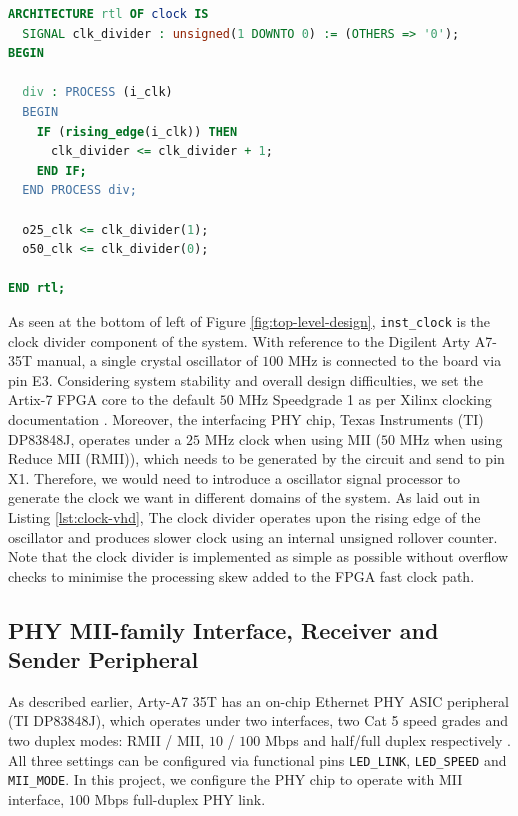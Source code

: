 \documentclass[a4paper]{report}
\newcommand{\code}{\texttt}
\begin{document}
\begin{lstlisting}[language=VHDL, caption=Snippet of Clock Divider \code{clock.vhd}, label={lst:clock-vhd}]
ARCHITECTURE rtl OF clock IS
  SIGNAL clk_divider : unsigned(1 DOWNTO 0) := (OTHERS => '0');
BEGIN

  div : PROCESS (i_clk)
  BEGIN
    IF (rising_edge(i_clk)) THEN
      clk_divider <= clk_divider + 1;
    END IF;
  END PROCESS div;

  o25_clk <= clk_divider(1);
  o50_clk <= clk_divider(0);
 
END rtl;
\end{lstlisting}

As seen at the bottom of left of Figure \ref{fig:top-level-design}, \code{inst\_clock} is the clock divider component of the system. With reference to the Digilent Arty A7-35T manual\cite{digilent-arty}, a single crystal oscillator of $100$ MHz is connected to the board via pin E3. Considering system stability and overall design difficulties, we set the Artix-7 FPGA core to the default $50$ MHz Speedgrade 1 as per Xilinx clocking documentation \cite{xilinx-7-clocking}. Moreover, the interfacing PHY chip, Texas Instruments (TI) DP83848J, operates under a $25$ MHz clock when using MII ($50$ MHz when using Reduce MII (RMII)), which needs to be generated by the circuit and send to pin X1\cite{texas-instruments-dp83848x}. Therefore, we would need to introduce a oscillator signal processor to generate the clock we want in different domains of the system. As laid out in Listing \ref{lst:clock-vhd}, The clock divider operates upon the rising edge of the oscillator and produces slower clock using an internal unsigned rollover counter. Note that the clock divider is implemented as simple as possible without overflow checks to minimise the processing skew added to the FPGA fast clock path.

\subsection{PHY MII-family Interface, Receiver and Sender Peripheral}
\label{section:implementation-hardware-implementation-phy-mac-peripheral}

As described earlier, Arty-A7 35T has an on-chip Ethernet PHY ASIC peripheral (TI DP83848J), which operates under two interfaces, two Cat 5 speed grades and two duplex modes: RMII / MII, $10$ / $100$ Mbps and half/full duplex respectively \cite{texas-instruments-dp83848x}. All three settings can be configured via functional pins \code{LED\_LINK}, \code{LED\_SPEED} and \code{MII\_MODE}. In this project, we configure the PHY chip to operate with MII interface, $100$ Mbps full-duplex PHY link.
\end{document}
